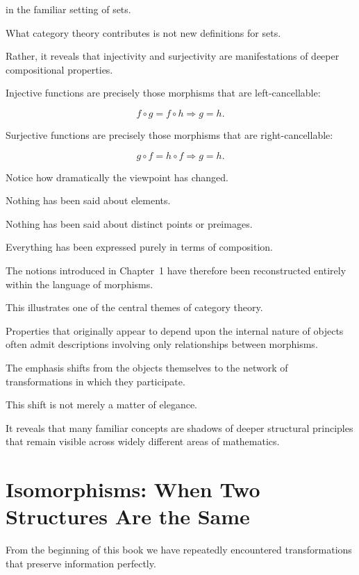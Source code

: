 \documentclass[11pt]{book}
\numberwithin{equation}{chapter}
\theoremstyle{definition}
\theoremstyle{plain}
\theoremstyle{remark}
\begin{document}
in the familiar setting of sets.

What category theory contributes is not new definitions for sets.

Rather, it reveals that injectivity and surjectivity are manifestations of deeper compositional properties.

Injective functions are precisely those morphisms that are left-cancellable:

\[
f\circ g
=
f\circ h
\Longrightarrow
g=h.
\]

Surjective functions are precisely those morphisms that are right-cancellable:

\[
g\circ f
=
h\circ f
\Longrightarrow
g=h.
\]

Notice how dramatically the viewpoint has changed.

Nothing has been said about elements.

Nothing has been said about distinct points or preimages.

Everything has been expressed purely in terms of composition.

The notions introduced in Chapter~1 have therefore been reconstructed entirely within the language of morphisms.

This illustrates one of the central themes of category theory.

Properties that originally appear to depend upon the internal nature of objects often admit descriptions involving only relationships between morphisms.

The emphasis shifts from the objects themselves to the network of transformations in which they participate.

This shift is not merely a matter of elegance.

It reveals that many familiar concepts are shadows of deeper structural principles that remain visible across widely different areas of mathematics.


\section{Isomorphisms: When Two Structures Are the Same}

From the beginning of this book we have repeatedly encountered transformations that preserve information perfectly.
\end{document}
